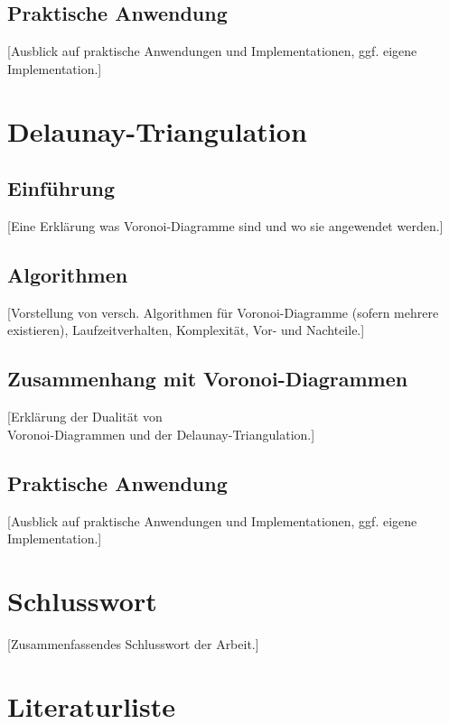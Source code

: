 \documentclass[pdftex,12pt,a4paper]{article}
\begin{document}
\subsection{Praktische Anwendung}
[Ausblick auf praktische Anwendungen und Implementationen, ggf. eigene Implementation.]

\newpage

\section{Delaunay-Triangulation}

\subsection{Einführung}
[Eine Erklärung was Voronoi-Diagramme sind und wo sie angewendet werden.]

\subsection{Algorithmen}
[Vorstellung von versch. Algorithmen für Voronoi-Diagramme (sofern mehrere existieren), Laufzeitverhalten, Komplexität, Vor- und Nachteile.]

\subsection{Zusammenhang mit Voronoi-Diagrammen}
[Erklärung der Dualität von \\
Voronoi-Diagrammen und der Delaunay-Triangulation.]

\subsection{Praktische Anwendung}
[Ausblick auf praktische Anwendungen und Implementationen, ggf. eigene Implementation.]

\newpage

\section{Schlusswort}
[Zusammenfassendes Schlusswort der Arbeit.]

\newpage

\section{Literaturliste}
\printbibliography

\newpage

\printglossary[numberedsection]
\end{document}
